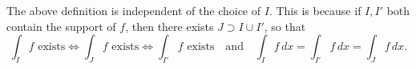 \begin{remark}
  The above definition is independent of the choice of
  $I$.
  This is because if $I, I'$ both contain the support
  of $f$, then there exists $J \supset I \cup I'$, so that
  \[
    \int_I f \text{ exists} \iff
    \int_J f \text{ exists} \iff
    \int_{I'} f \text{ exists}
    \quad \text{and} \quad
    \int_I f\, dx = \int_{I'} f\, dx = \int_J f\, dx.
  \]
\end{remark}
